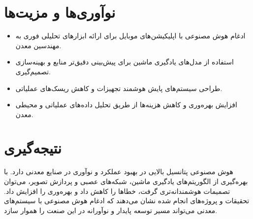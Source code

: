 \section*{نوآوری‌ها و مزیت‌ها}
\begin{itemize}
  \item ادغام هوش مصنوعی با اپلیکیشن‌های موبایل برای ارائه ابزارهای تحلیلی فوری به مهندسین معدن.
  \item استفاده از مدل‌های یادگیری ماشین برای پیش‌بینی دقیق‌تر منابع و بهینه‌سازی تصمیم‌گیری.
  \item طراحی سیستم‌های پایش هوشمند تجهیزات و کاهش ریسک‌های عملیاتی.
  \item افزایش بهره‌وری و کاهش هزینه‌ها از طریق تحلیل داده‌های عملیاتی و محیطی معدن.
\end{itemize}

\section*{نتیجه‌گیری}
هوش مصنوعی پتانسیل بالایی در بهبود عملکرد و نوآوری در صنایع معدنی دارد. با بهره‌گیری از الگوریتم‌های یادگیری ماشین، شبکه‌های عصبی و پردازش تصویر، می‌توان تصمیمات هوشمندانه‌تری گرفت، خطاها را کاهش داد و بهره‌وری را افزایش داد. تحقیقات و پروژه‌های انجام شده نشان می‌دهند که ادغام هوش مصنوعی با سیستم‌های معدنی می‌تواند مسیر توسعه پایدار و نوآورانه در این صنعت را هموار سازد.
